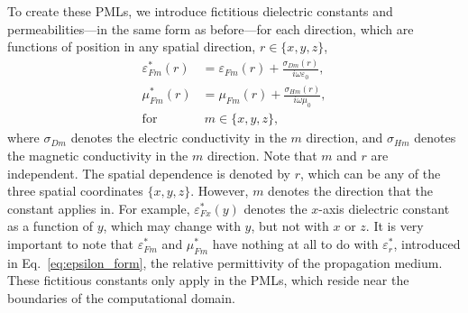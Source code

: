 \documentclass[12pt]{article}
\begin{document}
\begin{multicols}{2}
To create these PMLs, we introduce fictitious dielectric constants and permeabilities---in the same form as before---for each direction, which are functions of position in any spatial direction, $r\in\{x,y,z\}$,
\begin{equation}
\label{eq:fictitious}
\begin{aligned}
\varepsilon_{Fm}^*(r) &= \varepsilon_{Fm}(r)+\frac{\sigma_{Dm}(r)}{i\omega\varepsilon_0},\\
\mu_{Fm}^*(r) &= \mu_{Fm}(r)+\frac{\sigma_{Hm}(r)}{i\omega\mu_0},\\
\mathrm{for}&~m\in\{x,y,z\},
\end{aligned}
\end{equation}
where $\sigma_{Dm}$ denotes the electric conductivity in the $m$ direction, and $\sigma_{Hm}$ denotes the magnetic conductivity in the $m$ direction. Note that $m$ and $r$ are independent. The spatial dependence is denoted by $r$, which can be any of the three spatial coordinates $\{x,y,z\}$. However, $m$ denotes the direction that the constant applies in. For example, $\varepsilon_{Fx}^*(y)$ denotes the $x$-axis dielectric constant as a function of $y$, which may change with $y$, but not with $x$ or $z$. It is very important to note that $\varepsilon_{Fm}^*$ and $\mu_{Fm}^*$ have nothing at all to do with $\varepsilon_r^*$, introduced in Eq.~\ref{eq:epsilon_form}, the relative permittivity of the propagation medium. These fictitious constants only apply in the PMLs, which reside near the boundaries of the computational domain.


\end{multicols}
\end{document}
